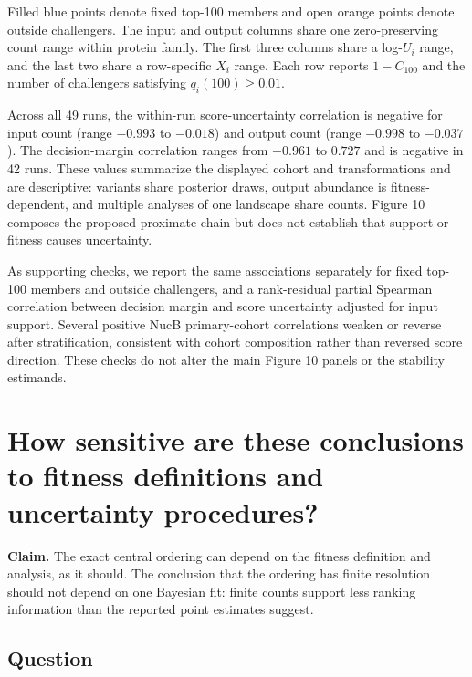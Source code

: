 \documentclass[11pt]{article}
\begin{document}
Filled blue points denote fixed top-100 members and open orange points denote outside challengers. The input and output columns share one zero-preserving count range within protein family. The first three columns share a log-$U_i$ range, and the last two share a row-specific $X_i$ range. Each row reports $1-C_{100}$ and the number of challengers satisfying $q_i(100)\geq0.01$.

Across all 49 runs, the within-run score-uncertainty correlation is negative for input count (range $-0.993$ to $-0.018$) and output count (range $-0.998$ to $-0.037$). The decision-margin correlation ranges from $-0.961$ to $0.727$ and is negative in 42 runs. These values summarize the displayed cohort and transformations and are descriptive: variants share posterior draws, output abundance is fitness-dependent, and multiple analyses of one landscape share counts. Figure 10 composes the proposed proximate chain but does not establish that support or fitness causes uncertainty.

As supporting checks, we report the same associations separately for fixed top-100 members and outside challengers, and a rank-residual partial Spearman correlation between decision margin and score uncertainty adjusted for input support. Several positive NucB primary-cohort correlations weaken or reverse after stratification, consistent with cohort composition rather than reversed score direction. These checks do not alter the main Figure 10 panels or the stability estimands.

\section{How sensitive are these conclusions to fitness definitions and uncertainty procedures?}

\begin{callout}
\textbf{Claim.}
The exact central ordering can depend on the fitness definition and analysis, as it should. The conclusion that the ordering has finite resolution should not depend on one Bayesian fit: finite counts support less ranking information than the reported point estimates suggest.
\end{callout}

\subsection*{Question}
\end{document}
